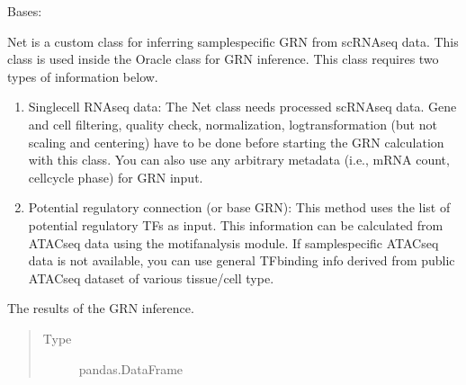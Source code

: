 \documentclass[letterpaper,10pt,english]{sphinxmanual}
\begin{document}
\begin{fulllineitems}
\label{\detokenize{modules/celloracle:celloracle.Net}}
Bases: 

Net is a custom class for inferring sample\sphinxhyphen{}specific GRN from scRNA\sphinxhyphen{}seq data.
This class is used inside the Oracle class for GRN inference.
This class requires two types of information below.
\begin{enumerate}
%
\item {} 
Single\sphinxhyphen{}cell RNA\sphinxhyphen{}seq data:
The Net class needs processed scRNA\sphinxhyphen{}seq data.
Gene and cell filtering, quality check, normalization, log\sphinxhyphen{}transformation (but not scaling and centering) have to be done before starting the GRN calculation with this class.
You can also use any arbitrary metadata (i.e., mRNA count, cell\sphinxhyphen{}cycle phase) for GRN input.

\item {} 
Potential regulatory connection (or base GRN):
This method uses the list of potential regulatory TFs as input.
This information can be calculated from ATAC\sphinxhyphen{}seq data using the motif\sphinxhyphen{}analysis module.
If sample\sphinxhyphen{}specific ATAC\sphinxhyphen{}seq data is not available,
you can use general TF\sphinxhyphen{}binding info derived from public ATAC\sphinxhyphen{}seq dataset of various tissue/cell type.

\end{enumerate}

\begin{fulllineitems}
\label{\detokenize{modules/celloracle:celloracle.Net.linkList}}
The results of the GRN inference.
\begin{quote}\begin{description}
\item[{Type}] \leavevmode
pandas.DataFrame


\end{description}
\end{quote}
\end{fulllineitems}
\end{fulllineitems}
\end{document}
